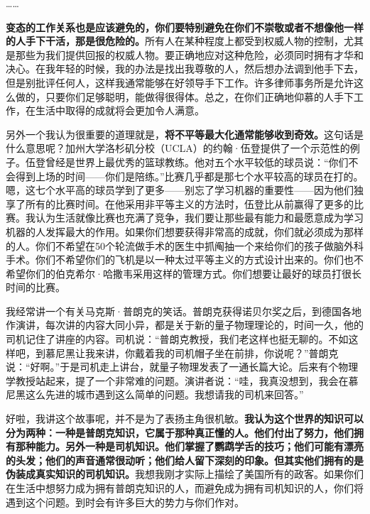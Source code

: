 {\centering ……\par}

\textbf{变态的工作关系也是应该避免的，你们要特别避免在你们不崇敬或者不想像他一样的人手下干活，那是很危险的。}所有人在某种程度上都受到权威人物的控制，尤其是那些为我们提供回报的权威人物。要正确地应对这种危险，必须同时拥有才华和决心。在我年轻的时候，我的办法是找出我尊敬的人，然后想办法调到他手下去，但是别批评任何人，这样我通常能够在好领导手下工作。许多律师事务所是允许这么做的，只要你们足够聪明，能做得很得体。总之，在你们正确地仰慕的人手下工作，在生活中取得的成就将会更加令人满意。
\par

另外一个我认为很重要的道理就是，\textbf{将不平等最大化通常能够收到奇效。}这句话是什么意思呢？加州大学洛杉矶分校（UCLA）的约翰·伍登提供了一个示范性的例子。伍登曾经是世界上最优秀的篮球教练。他对五个水平较低的球员说：“你们不会得到上场的时间——你们是陪练。”比赛几乎都是那七个水平较高的球员在打的。嗯，这七个水平高的球员学到了更多——别忘了学习机器的重要性——因为他们独享了所有的比赛时间。在他采用非平等主义的方法时，伍登比从前赢得了更多的比赛。我认为生活就像比赛也充满了竞争，我们要让那些最有能力和最愿意成为学习机器的人发挥最大的作用。如果你们想要获得非常高的成就，你们就必须成为那样的人。你们不希望在50个轮流做手术的医生中抓阄抽一个来给你们的孩子做脑外科手术。你们不希望你们的飞机是以一种太过平等主义的方式设计出来的。你们也不希望你们的伯克希尔·哈撒韦采用这样的管理方式。你们想要让最好的球员打很长时间的比赛。
\par

我经常讲一个有关马克斯·普朗克的笑话。普朗克获得诺贝尔奖之后，到德国各地作演讲，每次讲的内容大同小异，都是关于新的量子物理理论的，时间一久，他的司机记住了讲座的内容。司机说：“普朗克教授，我们老这样也挺无聊的。不如这样吧，到慕尼黑让我来讲，你戴着我的司机帽子坐在前排，你说呢？”普朗克说：“好啊。”于是司机走上讲台，就量子物理发表了一通长篇大论。后来有个物理学教授站起来，提了一个非常难的问题。演讲者说：“哇，我真没想到，我会在慕尼黑这么先进的城市遇到这么简单的问题。我想请我的司机来回答。”
\par

好啦，我讲这个故事呢，并不是为了表扬主角很机敏。\textbf{我认为这个世界的知识可以分为两种：一种是普朗克知识，它属于那种真正懂的人。他们付出了努力，他们拥有那种能力。另外一种是司机知识。他们掌握了鹦鹉学舌的技巧；他们可能有漂亮的头发；他们的声音通常很动听；他们给人留下深刻的印象。但其实他们拥有的是伪装成真实知识的司机知识。}我想我刚才实际上描绘了美国所有的政客。如果你们在生活中想努力成为拥有普朗克知识的人，而避免成为拥有司机知识的人，你们将遇到这个问题。到时会有许多巨大的势力与你们作对。
\par

